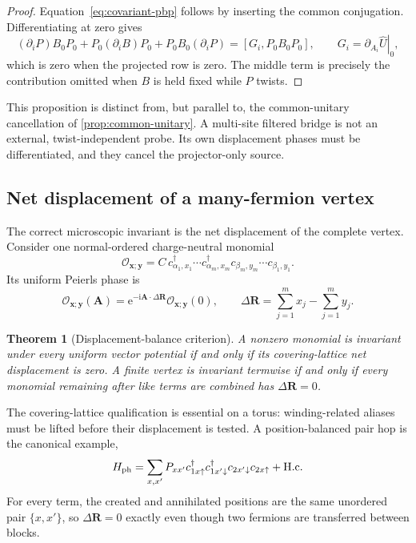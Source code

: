 \documentclass[11pt]{article}
\newtheorem{theorem}{Theorem}[section]
\theoremstyle{remark}
\newcommand{\I}{\mathrm i}
\newcommand{\e}{\mathrm e}
\begin{document}
\begin{proof}
Equation~\eqref{eq:covariant-pbp} follows by inserting the common conjugation.  Differentiating at zero gives
\begin{equation}
 (\partial_iP)B_0P_0+P_0(\partial_iB)P_0+P_0B_0(\partial_iP)
 =[G_i,P_0B_0P_0],
 \qquad G_i=\left.\partial_{A_i}\widehat U\right|_0,
\end{equation}
which is zero when the projected row is zero.  The middle term is precisely the contribution omitted when $B$ is held fixed while $P$ twists.
\end{proof}

This proposition is distinct from, but parallel to, the common-unitary cancellation of \cref{prop:common-unitary}.  A multi-site filtered bridge is not an external, twist-independent probe.  Its own displacement phases must be differentiated, and they cancel the projector-only source.

\subsection{Net displacement of a many-fermion vertex}

The correct microscopic invariant is the net displacement of the complete vertex.  Consider one normal-ordered charge-neutral monomial
\begin{equation}
 \mathcal O_{\bm x;\bm y}
 =C\,c_{\alpha_1,x_1}^\dagger\cdots c_{\alpha_m,x_m}^\dagger
 c_{\beta_m,y_m}\cdots c_{\beta_1,y_1}.
\end{equation}
Its uniform Peierls phase is
\begin{equation}
 \mathcal O_{\bm x;\bm y}(\bm A)
 =\e^{-\I\bm A\cdot\Delta\bm R}\mathcal O_{\bm x;\bm y}(0),
 \qquad
 \Delta\bm R=\sum_{j=1}^m x_j-\sum_{j=1}^m y_j.
 \label{eq:net-displacement-phase}
\end{equation}

\begin{theorem}[Displacement-balance criterion]
\label{thm:displacement-balance}
A nonzero monomial is invariant under every uniform vector potential if and only if its covering-lattice net displacement is zero.  A finite vertex is invariant termwise if and only if every monomial remaining after like terms are combined has $\Delta\bm R=0$.
\end{theorem}

The covering-lattice qualification is essential on a torus: winding-related aliases must be lifted before their displacement is tested.  A position-balanced pair hop is the canonical example,
\begin{equation}
 H_{\rm ph}=\sum_{x,x'}P_{xx'}
 c_{1x\uparrow}^\dagger c_{1x'\downarrow}^\dagger
 c_{2x'\downarrow}c_{2x\uparrow}+{\rm H.c.}
 \label{eq:position-balanced-pair-hop}
\end{equation}
For every term, the created and annihilated positions are the same unordered pair $\{x,x'\}$, so $\Delta\bm R=0$ exactly even though two fermions are transferred between blocks.
\end{document}
